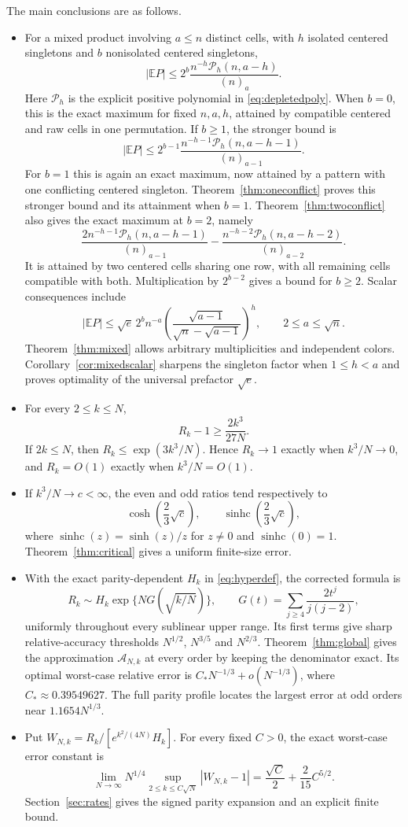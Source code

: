 \documentclass[11pt]{article}
\theoremstyle{definition}
\theoremstyle{remark}
\newcommand{\E}{\mathbb E}
\newcommand{\1}{\mathbf 1}
\newcommand{\shc}{\operatorname{sinhc}}
\begin{document}
The main conclusions are as follows.
\begin{itemize}
\item For a mixed product involving $a\le n$ distinct cells, with $h$ isolated centered singletons and $b$ nonisolated centered singletons,
\[
|\E P|\le2^b\frac{n^{-h}\mathcal P_h(n,a-h)}{(n)_a}.
\]
Here $\mathcal P_h$ is the explicit positive polynomial in \eqref{eq:depletedpoly}. When $b=0$, this is the exact maximum for fixed $n,a,h$, attained by compatible centered and raw cells in one permutation. If $b\ge1$, the stronger bound is
\[
|\E P|\le2^{b-1}\frac{n^{-h-1}\mathcal P_h(n,a-h-1)}{(n)_{a-1}}.
\]
For $b=1$ this is again an exact maximum, now attained by a pattern with one conflicting centered singleton. Theorem~\ref{thm:oneconflict} proves this stronger bound and its attainment when $b=1$. Theorem~\ref{thm:twoconflict} also gives the exact maximum at $b=2$, namely
\[
\frac{2n^{-h-1}\mathcal P_h(n,a-h-1)}{(n)_{a-1}}
-\frac{n^{-h-2}\mathcal P_h(n,a-h-2)}{(n)_{a-2}}.
\]
It is attained by two centered cells sharing one row, with all remaining cells compatible with both. Multiplication by $2^{b-2}$ gives a bound for $b\ge2$. Scalar consequences include
\[
|\E P|\le\sqrt e\,2^b n^{-a}
\left(\frac{\sqrt{a-1}}{\sqrt n-\sqrt{a-1}}\right)^h,
\qquad 2\le a\le\sqrt n.
\]
Theorem~\ref{thm:mixed} allows arbitrary multiplicities and independent colors. Corollary~\ref{cor:mixedscalar} sharpens the singleton factor when $1\le h<a$ and proves optimality of the universal prefactor $\sqrt e$.
\item For every $2\le k\le N$,
\[
R_k-1\ge\frac{2k^3}{27N}.
\]
If $2k\le N$, then $R_k\le\exp(3k^3/N)$. Hence $R_k\to1$ exactly when $k^3/N\to0$, and $R_k=O(1)$ exactly when $k^3/N=O(1)$.
\item If $k^3/N\to c<\infty$, the even and odd ratios tend respectively to
\[
\cosh\left(\frac23\sqrt c\right),\qquad
\shc\left(\frac23\sqrt c\right),
\]
where $\shc(z)=\sinh(z)/z$ for $z\ne0$ and $\shc(0)=1$. Theorem~\ref{thm:critical} gives a uniform finite-size error.
\item With the exact parity-dependent $H_k$ in \eqref{eq:hyperdef}, the corrected formula is
\[
R_k\sim H_k\exp\{NG(\sqrt{k/N})\},\qquad
G(t)=\sum_{j\ge4}\frac{2t^j}{j(j-2)},
\]
uniformly throughout every sublinear upper range. Its first terms give sharp relative-accuracy thresholds $N^{1/2}$, $N^{3/5}$ and $N^{2/3}$. Theorem~\ref{thm:global} gives the approximation $\mathcal A_{N,k}$ at every order by keeping the denominator exact. Its optimal worst-case relative error is $C_*N^{-1/3}+o(N^{-1/3})$, where $C_*\approx0.39549627$. The full parity profile locates the largest error at odd orders near $1.1654N^{1/3}$.
\item Put $W_{N,k}=R_k/[e^{k^2/(4N)}H_k]$. For every fixed $C>0$, the exact worst-case error constant is
\[
\lim_{N\to\infty}N^{1/4}
\sup_{2\le k\le C\sqrt N}|W_{N,k}-1|
=\frac{\sqrt C}{2}+\frac{2}{15}C^{5/2}.
\]
Section~\ref{sec:rates} gives the signed parity expansion and an explicit finite bound.
\end{itemize}
\end{document}
